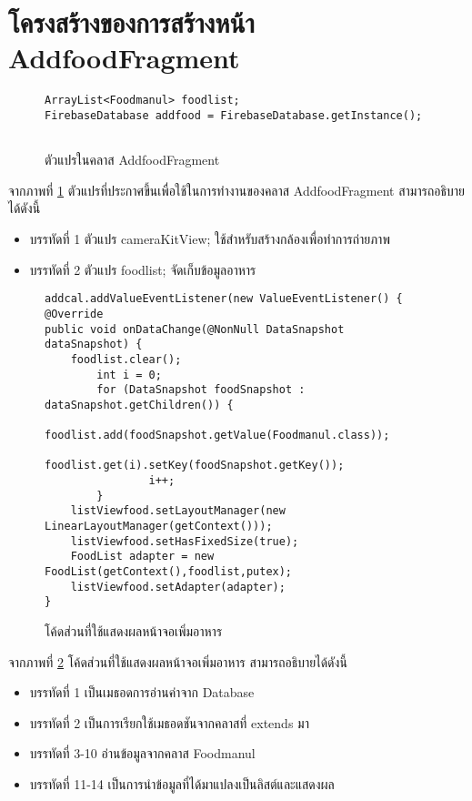 	\section{โครงสร้างของการสร้างหน้า AddfoodFragment}
	\begin{figure}[H]
		{\begin{lstlisting}
ArrayList<Foodmanul> foodlist;
FirebaseDatabase addfood = FirebaseDatabase.getInstance();
			 
			\end{lstlisting}}
		\caption{ตัวแปรในคลาส AddfoodFragment}
		\label{Fig:Addfood1}
	\end{figure}
	จากภาพที่ \ref{Fig:Addfood1} ตัวแปรที่ประกาศขึ้นเพื่อใช้ในการทำงานของคลาส AddfoodFragment สามารถอธิบายได้ดังนี้
	\begin{itemize}[label={--}]
		\item บรรทัดที่ 1 ตัวแปร cameraKitView; ใช้สำหรับสร้างกล้องเพื่อทำการถ่ายภาพ
		\item บรรทัดที่ 2 ตัวแปร foodlist; จัดเก็บข้อมูลอาหาร
	
	\end{itemize}

	\begin{figure}[H]
		{\begin{lstlisting}
addcal.addValueEventListener(new ValueEventListener() {
@Override
public void onDataChange(@NonNull DataSnapshot dataSnapshot) {
	foodlist.clear();
		int i = 0;
		for (DataSnapshot foodSnapshot : dataSnapshot.getChildren()) {
				foodlist.add(foodSnapshot.getValue(Foodmanul.class));
				foodlist.get(i).setKey(foodSnapshot.getKey());
				i++;
		}
	listViewfood.setLayoutManager(new LinearLayoutManager(getContext()));
	listViewfood.setHasFixedSize(true);
	FoodList adapter = new FoodList(getContext(),foodlist,putex);
	listViewfood.setAdapter(adapter);
}

\end{lstlisting}}
		\caption{โค้ดส่วนที่ใช้แสดงผลหน้าจอเพิ่มอาหาร}
		\label{Fig:Addfood3}
	\end{figure}
	\newpage
	จากภาพที่ \ref{Fig:Addfood3} โค้ดส่วนที่ใช้แสดงผลหน้าจอเพิ่มอาหาร สามารถอธิบายได้ดังนี้
	\begin{itemize}[label={--}]
		\item บรรทัดที่ 1  เป็นเมธอดการอ่านค่าจาก Database
		\item บรรทัดที่ 2  เป็นการเรียกใช้เมธอดชันจากคลาสที่ extends มา 
		\item บรรทัดที่ 3-10 อ่านข้อมูลจากคลาส Foodmanul
		\item บรรทัดที่ 11-14 เป็นการนำข้อมูลที่ได้มาแปลงเป็นลิสต์และแสดงผล

	\end{itemize}




